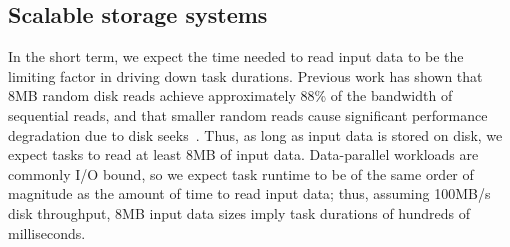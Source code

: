 




\subsection{Scalable storage systems}

In the short term, we expect the time needed to read input data to be the
limiting factor in driving down task durations.
Previous work has shown that 8MB random disk reads achieve approximately 88\%
of the bandwidth of sequential reads, and that smaller
random reads cause significant performance degradation due to disk seeks~\cite{nightingale2012flat}. Thus, as long as input data is stored on disk, we
expect tasks to read at least 8MB of input data. Data-parallel
workloads are commonly I/O bound, so we expect task runtime to be of the
same order of magnitude as the amount of time to read input data; thus,
assuming 100MB/s disk throughput, 8MB input data sizes imply task durations
of hundreds of milliseconds.


